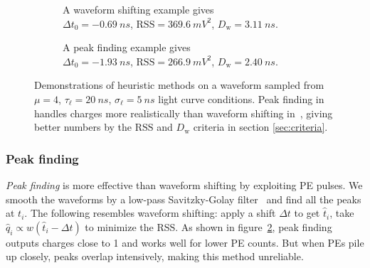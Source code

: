 \begin{figure}[H]
  \begin{subfigure}{.5\textwidth}
    \centering
    \resizebox{\textwidth}{!}{}
    \caption{\label{fig:shifting} A waveform shifting example gives \\ $\Delta t_0=\SI{-0.69}{ns}$, $\mathrm{RSS}=\SI{369.6}{mV^2}$, $D_\mathrm{w}=\SI{3.11}{ns}$.}
  \end{subfigure}
  \begin{subfigure}{.5\textwidth}
    \centering
    \resizebox{\textwidth}{!}{}
    \caption{\label{fig:peak} A peak finding example gives \\ $\Delta t_0=\SI{-1.93}{ns}$, $\mathrm{RSS}=\SI{266.9}{mV^2}$, $D_\mathrm{w}=\SI{2.40}{ns}$.}
  \end{subfigure}
  \caption{\label{fig:method}Demonstrations of heuristic methods on a waveform sampled from $\mu=4$, $\tau_\ell=\SI{20}{ns}$, $\sigma_\ell=\SI{5}{ns}$ light curve conditions.  Peak finding in~ handles charges more realistically than waveform shifting in~, giving better numbers by the $\mathrm{RSS}$ and $D_\mathrm{w}$ criteria in section \ref{sec:criteria}.}
\end{figure}

\subsubsection{Peak finding}
\label{sec:findpeak}

\textit{Peak finding} is more effective than waveform shifting by exploiting PE pulses.  We smooth the waveforms by a low-pass Savitzky-Golay filter~\cite{savitzky_smoothing_1964} and find all the peaks at $t_i$.  The following resembles waveform shifting: apply a shift $\Delta t$ to get $\hat{t}_i$, take $\hat{q}_i \propto w(\hat{t}_i - \Delta t)$ to minimize the RSS. As shown in figure~\ref{fig:peak}, peak finding outputs charges close to 1 and works well for lower PE counts.  But when PEs pile up closely, peaks overlap intensively, making this method unreliable.

